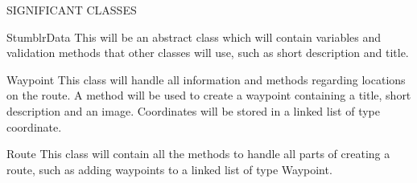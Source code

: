 \documentclass{article}
\begin{document}
	\clearpage
	\begin{section}{SIGNIFICANT CLASSES}
		\begin{subsection}{StumblrData}
		This will be an abstract class which will contain variables and validation methods that other classes will use, such as short description and title.
		\end{subsection}

		\begin{subsection}{Waypoint}
		This class will handle all information and methods regarding locations on the route. A method will be used to create a waypoint containing a title, short description and an image. Coordinates will be stored in a linked list of type coordinate.
		\end{subsection}

		\begin{subsection}{Route}
		This class will contain all the methods to handle all parts of creating a route, such as adding waypoints to a linked list of type Waypoint. 
		\end{subsection}
	\end{section}
	
\end{document}
